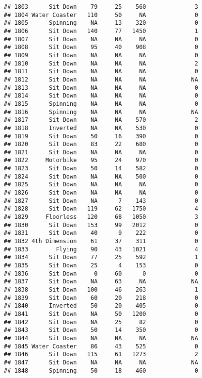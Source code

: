 \documentclass[
]{article}
\begin{document}
\begin{verbatim}
## 1803      Sit Down    79     25    560              3
## 1804 Water Coaster   110     50     NA              0
## 1805      Spinning    NA     13    320              0
## 1806      Sit Down   140     77   1450              1
## 1807      Sit Down    NA     NA     NA              0
## 1808      Sit Down    95     40    908              0
## 1809      Sit Down    NA     NA     NA              0
## 1810      Sit Down    NA     NA     NA              2
## 1811      Sit Down    NA     NA     NA              0
## 1812      Sit Down    NA     NA     NA             NA
## 1813      Sit Down    NA     NA     NA              0
## 1814      Sit Down    NA     NA     NA              0
## 1815      Spinning    NA     NA     NA              0
## 1816      Spinning    NA     NA     NA             NA
## 1817      Sit Down    NA     NA    570              2
## 1818      Inverted    NA     NA    530              0
## 1819      Sit Down    50     16    390              0
## 1820      Sit Down    83     22    680              0
## 1821      Sit Down    NA     NA     NA              0
## 1822     Motorbike    95     24    970              0
## 1823      Sit Down    50     14    582              0
## 1824      Sit Down    NA     NA    500              0
## 1825      Sit Down    NA     NA     NA              0
## 1826      Sit Down    NA     NA     NA              0
## 1827      Sit Down    NA      7    143              0
## 1828      Sit Down   119     62   1750              4
## 1829     Floorless   120     68   1050              3
## 1830      Sit Down   153     99   2012              0
## 1831      Sit Down    40      9    222              0
## 1832 4th Dimension    61     37    311              0
## 1833        Flying    90     43   1021              4
## 1834      Sit Down    77     25    592              1
## 1835      Sit Down    25      4    153              0
## 1836      Sit Down     0     60      0              0
## 1837      Sit Down    NA     63     NA             NA
## 1838      Sit Down   100     46    263              1
## 1839      Sit Down    60     20    218              0
## 1840      Inverted    50     20    405              0
## 1841      Sit Down    NA     50   1200              0
## 1842      Sit Down    NA     25     82              0
## 1843      Sit Down    50     14    350              0
## 1844      Sit Down    NA     NA     NA             NA
## 1845 Water Coaster    86     43    525              0
## 1846      Sit Down   115     61   1273              2
## 1847      Sit Down    NA     NA     NA             NA
## 1848      Spinning    50     18    460              0

\end{verbatim}
\end{document}

